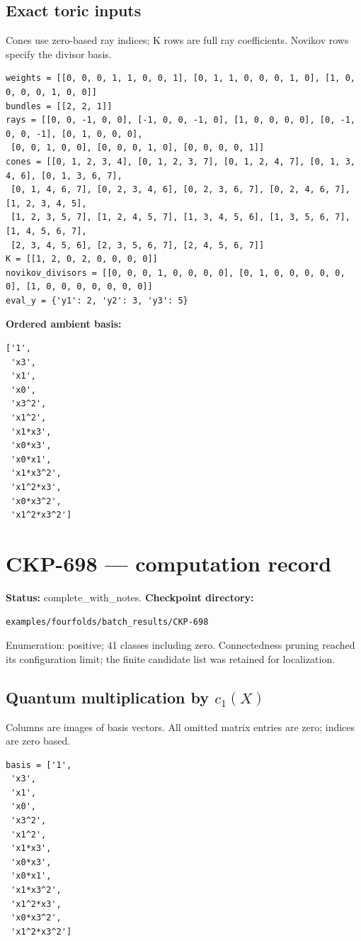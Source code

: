 \documentclass[10pt,a4paper]{article}
\begin{document}
\subsection*{Exact toric inputs}
Cones use zero-based ray indices; K rows are full ray coefficients. Novikov rows specify the divisor basis.

\begin{lstlisting}
weights = [[0, 0, 0, 1, 1, 0, 0, 1], [0, 1, 1, 0, 0, 0, 1, 0], [1, 0, 0, 0, 0, 1, 0, 0]]
bundles = [[2, 2, 1]]
rays = [[0, 0, -1, 0, 0], [-1, 0, 0, -1, 0], [1, 0, 0, 0, 0], [0, -1, 0, 0, -1], [0, 1, 0, 0, 0],
 [0, 0, 1, 0, 0], [0, 0, 0, 1, 0], [0, 0, 0, 0, 1]]
cones = [[0, 1, 2, 3, 4], [0, 1, 2, 3, 7], [0, 1, 2, 4, 7], [0, 1, 3, 4, 6], [0, 1, 3, 6, 7],
 [0, 1, 4, 6, 7], [0, 2, 3, 4, 6], [0, 2, 3, 6, 7], [0, 2, 4, 6, 7], [1, 2, 3, 4, 5],
 [1, 2, 3, 5, 7], [1, 2, 4, 5, 7], [1, 3, 4, 5, 6], [1, 3, 5, 6, 7], [1, 4, 5, 6, 7],
 [2, 3, 4, 5, 6], [2, 3, 5, 6, 7], [2, 4, 5, 6, 7]]
K = [[1, 2, 0, 2, 0, 0, 0, 0]]
novikov_divisors = [[0, 0, 0, 1, 0, 0, 0, 0], [0, 1, 0, 0, 0, 0, 0, 0], [1, 0, 0, 0, 0, 0, 0, 0]]
eval_y = {'y1': 2, 'y2': 3, 'y3': 5}
\end{lstlisting}

\textbf{Ordered ambient basis:}
\begin{lstlisting}
['1',
 'x3',
 'x1',
 'x0',
 'x3^2',
 'x1^2',
 'x1*x3',
 'x0*x3',
 'x0*x1',
 'x1*x3^2',
 'x1^2*x3',
 'x0*x3^2',
 'x1^2*x3^2']
\end{lstlisting}

\clearpage\section*{CKP-698 --- computation record}
\textbf{Status:} complete\_with\_notes.
\textbf{Checkpoint directory:}
\begin{lstlisting}
examples/fourfolds/batch_results/CKP-698
\end{lstlisting}

Enumeration: positive; 41 classes including zero.
Connectedness pruning reached its configuration limit; the finite candidate list was retained for localization.
\subsection*{Quantum multiplication by $c_1(X)$}
Columns are images of basis vectors. All omitted matrix entries are zero; indices are zero based.

\begin{lstlisting}
basis = ['1',
 'x3',
 'x1',
 'x0',
 'x3^2',
 'x1^2',
 'x1*x3',
 'x0*x3',
 'x0*x1',
 'x1*x3^2',
 'x1^2*x3',
 'x0*x3^2',
 'x1^2*x3^2']
\end{lstlisting}
\end{document}
